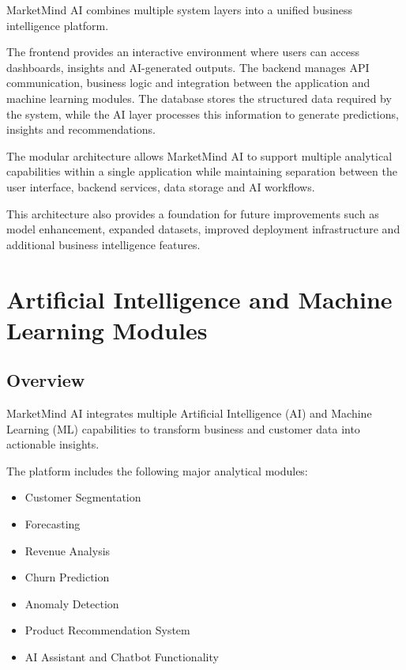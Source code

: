 \documentclass[12pt,a4paper]{report}
\begin{document}
MarketMind AI combines multiple system layers into a unified business
intelligence platform.

The frontend provides an interactive environment where users can access
dashboards, insights and AI-generated outputs. The backend manages API
communication, business logic and integration between the application
and machine learning modules. The database stores the structured data
required by the system, while the AI layer processes this information to
generate predictions, insights and recommendations.

The modular architecture allows MarketMind AI to support multiple
analytical capabilities within a single application while maintaining
separation between the user interface, backend services, data storage
and AI workflows.

This architecture also provides a foundation for future improvements
such as model enhancement, expanded datasets, improved deployment
infrastructure and additional business intelligence features.

\newpage






\chapter{Artificial Intelligence and Machine Learning Modules}

\section{Overview}

MarketMind AI integrates multiple Artificial Intelligence (AI) and
Machine Learning (ML) capabilities to transform business and customer
data into actionable insights.

The platform includes the following major analytical modules:

\begin{itemize}[leftmargin=1.2cm]
    \item Customer Segmentation
    \item Forecasting
    \item Revenue Analysis
    \item Churn Prediction
    \item Anomaly Detection
    \item Product Recommendation System
    \item AI Assistant and Chatbot Functionality
\end{itemize}
\end{document}
